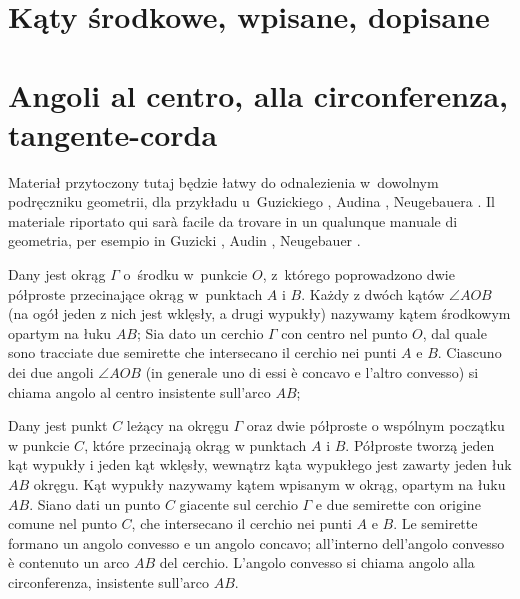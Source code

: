 
%

\section{Kąty środkowe, wpisane, dopisane} %
\section{Angoli al centro, alla circonferenza, tangente-corda} %

Materiał przytoczony tutaj będzie łatwy do odnalezienia w~dowolnym podręczniku geometrii, dla przykładu u~Guzickiego \cite[s. 11-13, 18, 19]{guzicki_2021}, Audina \cite[s. 74, 75]{audin_2003}, Neugebauera \cite[s. 22, 23]{neugebauer_2018}. %
Il materiale riportato qui sarà facile da trovare in un qualunque manuale di geometria, per esempio in Guzicki \cite[pp. 11-13, 18, 19]{guzicki_2021}, Audin \cite[pp. 74, 75]{audin_2003}, Neugebauer \cite[pp. 22, 23]{neugebauer_2018}. %

\begin{definition}
    Dany jest okrąg $\Gamma$ o~środku w~punkcie $O$, z~którego poprowadzono dwie półproste przecinające okrąg w~punktach $A$ i $B$. %
    Każdy z dwóch kątów $\angle AOB$ (na ogół jeden z nich jest wklęsły, a drugi wypukły) nazywamy kątem środkowym opartym na łuku $AB$; %
    Sia dato un cerchio $\Gamma$ con centro nel punto $O$, dal quale sono tracciate due semirette che intersecano il cerchio nei punti $A$ e $B$. %
    Ciascuno dei due angoli $\angle AOB$ (in generale uno di essi è concavo e l'altro convesso) si chiama angolo al centro insistente sull'arco $AB$; %
\end{definition}

\begin{definition}
    Dany jest punkt $C$ leżący na okręgu $\Gamma$ oraz dwie półproste o wspólnym początku w punkcie $C$, które przecinają okrąg w punktach $A$ i $B$. %
    Półproste tworzą jeden kąt wypukły i jeden kąt wklęsły, wewnątrz kąta wypukłego jest zawarty jeden łuk $AB$ okręgu. %
    Kąt wypukły nazywamy kątem wpisanym w okrąg, opartym na łuku $AB$. %
    Siano dati un punto $C$ giacente sul cerchio $\Gamma$ e due semirette con origine comune nel punto $C$, che intersecano il cerchio nei punti $A$ e $B$. %
    Le semirette formano un angolo convesso e un angolo concavo; all'interno dell'angolo convesso è contenuto un arco $AB$ del cerchio. %
    L'angolo convesso si chiama angolo alla circonferenza, insistente sull'arco $AB$. %
\end{definition}

